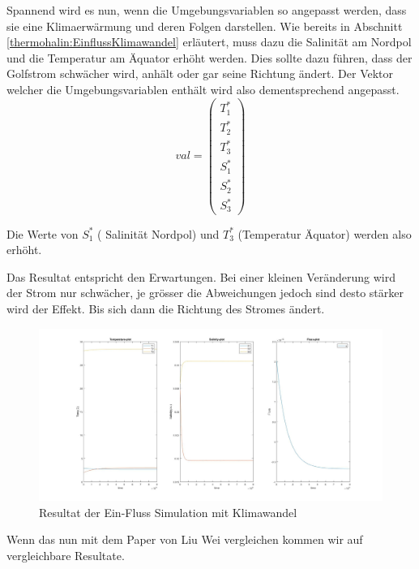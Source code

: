 Spannend wird es nun, wenn die Umgebungsvariablen so angepasst werden, dass sie eine Klimaerwärmung und deren Folgen darstellen. Wie bereits in Abschnitt \ref{thermohalin:EinflussKlimawandel} erläutert, muss dazu die Salinität am Nordpol und die Temperatur am Äquator erhöht werden. Dies sollte dazu führen, dass der Golfstrom schwächer wird, anhält oder gar seine Richtung ändert. 
Der Vektor welcher die Umgebungsvariablen enthält wird also dementsprechend angepasst.
\begin{equation*}
val = \begin{pmatrix}T_{1}^{*} \\ T_{2}^{*} \\ T_{3}^{*} \\ S_{1}^{*} \\ S_{2}^{*} \\ S_{3}^{*}\end{pmatrix}
\end{equation*}

Die Werte von $S_1^*$ ( Salinität Nordpol) und $T_3^*$ (Temperatur Äquator) werden also erhöht.

Das Resultat entspricht den Erwartungen. Bei einer kleinen Veränderung wird der Strom nur schwächer, je grösser die Abweichungen jedoch sind desto stärker wird der Effekt.
Bis sich dann die Richtung des Stromes ändert.

\begin{figure}
	\centering
	\includegraphics[width=14cm]{thermohalin/Code/graphs/3b1f-skript-klimawandel.jpg}
	\caption{Resultat der Ein-Fluss Simulation mit Klimawandel}
	\label{thermohalin:3b1f-skript-klimawandel}
\end{figure}

Wenn das nun mit dem Paper von Liu Wei \cite{thermohalin:liuwei} vergleichen kommen wir auf vergleichbare Resultate.


